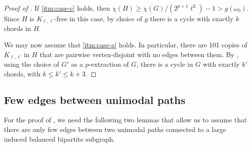 \documentclass[11pt,english]{article}
\theoremstyle{plain}
\theoremstyle{definition}
\theoremstyle{remark}
\begin{document}
\begin{proof}[Proof of ]
        If \ref{itm:case-c} holds, then $\chi(H) \ge \chi(G)/(2^{p+1}\ell^2) - 1 > g(\omega_0)$. Since $H$ is $K_{\ell, \ell}$-free in this case, by choice of $g$ there is a cycle with exactly $k$ chords in $H$.
        
        We may now assume that \ref{itm:case-a} holds. In particular, there are 101 copies of $K_{\ell, \ell}$ in $H$ that are pairwise vertex-disjoint with no edges between them. By , using the choice of $G'$ as a $p$-extraction of $G$, there is a cycle in $G$ with exactly $k'$ chords, with $k\leq k'\leq k+3$.
    \end{proof}

    \subsection{Few edges between unimodal paths} \label{subsec:few-edges-unimodal}
    
    For the proof of , we need the following two lemmas that allow us to assume that there are only few edges between two unimodal paths connected to a large induced balanced bipartite subgraph.
\end{document}
